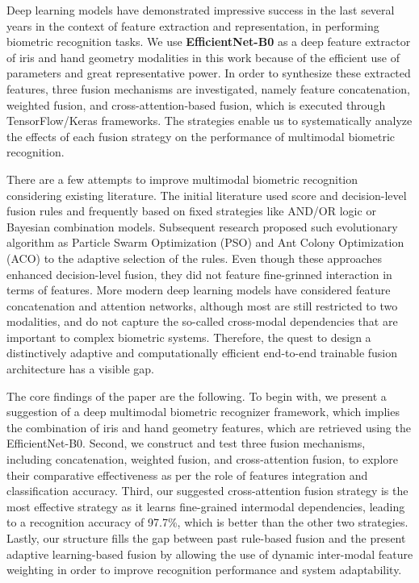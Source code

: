 \documentclass[12pt,a4paper]{report}
\begin{document}
Deep learning models have demonstrated impressive success in the last several years in the context of feature extraction and representation, in performing biometric recognition tasks. We use \textbf{EfficientNet-B0} as a deep feature extractor of iris and hand geometry modalities in this work because of the efficient use of parameters and great representative power. In order to synthesize these extracted features, three fusion mechanisms are investigated, namely feature concatenation, weighted fusion, and cross-attention-based fusion, which is executed through TensorFlow/Keras frameworks. The strategies enable us to systematically analyze the effects of each fusion strategy on the performance of multimodal biometric recognition.

There are a few attempts to improve multimodal biometric recognition considering existing literature. The initial literature used score and decision-level fusion rules and frequently based on fixed strategies like AND/OR logic or Bayesian combination models. Subsequent research proposed such evolutionary algorithm as Particle Swarm Optimization (PSO) and Ant Colony Optimization (ACO) to the adaptive selection of the rules. Even though these approaches enhanced decision-level fusion, they did not feature fine-grinned interaction in terms of features. More modern deep learning models have considered feature concatenation and attention networks, although most are still restricted to two modalities, and do not capture the so-called cross-modal dependencies that are important to complex biometric systems. Therefore, the quest to design a distinctively adaptive and computationally efficient end-to-end trainable fusion architecture has a visible gap.

The core findings of the paper are the following. To begin with, we present a suggestion of a deep multimodal biometric recognizer framework, which implies the combination of iris and hand geometry features, which are retrieved using the EfficientNet-B0. Second, we construct and test three fusion mechanisms, including concatenation, weighted fusion, and cross-attention fusion, to explore their comparative effectiveness as per the role of features integration and classification accuracy. Third, our suggested cross-attention fusion strategy is the most effective strategy as it learns fine-grained intermodal dependencies, leading to a recognition accuracy of 97.7\%, which is better than the other two strategies. Lastly, our structure fills the gap between past rule-based fusion and the present adaptive learning-based fusion by allowing the use of dynamic inter-modal feature weighting in order to improve recognition performance and system adaptability.
\end{document}
